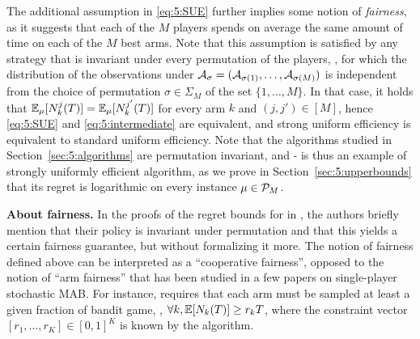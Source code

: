 The additional assumption in \eqref{eq:5:SUE} further implies some notion of \emph{fairness}, as it suggests that each of the $M$ players spends on average the same amount of time on each of the $M$ best arms. Note that this assumption is satisfied by any strategy that is invariant under every permutation of the players, \ie, for which the distribution of the observations under $\mathcal{A}_{\sigma} = (\mathcal{A}_{\sigma(1)},\dots,\mathcal{A}_{\sigma(M)})$ is independent from the choice of permutation $\sigma \in \Sigma_M$ of the set $\{1,\dots,M\}$.
In that case, it holds that  $\mathbb{E}_{\mu}[N_k^j(T)]=\mathbb{E}_{\mu}[N_k^{j'}(T)]$ for every arm $k$ and $(j,j') \in [M]$, hence \eqref{eq:5:SUE} and \eqref{eq:5:intermediate} are equivalent, and strong uniform efficiency is equivalent to standard uniform efficiency.
Note that the algorithms studied in Section~\ref{sec:5:algorithms} are permutation invariant, and \MCTopM-\klUCB{} is thus an example of strongly uniformly efficient algorithm, as we prove in Section~\ref{sec:5:upperbounds} that its regret is logarithmic on every instance $\mu \in \mathcal{P}_M$.

\textbf{About fairness.}
%
In the proofs of the regret bounds for \rhoRand{} in \cite{Anandkumar11}, the authors briefly mention that their policy is invariant under permutation and that this yields a certain fairness guarantee, but without formalizing it more.
The notion of fairness defined above can be interpreted as a ``cooperative fairness'', opposed to the notion of ``arm fairness'' that has been studied in a few papers on single-player stochastic MAB.
For instance, \cite{Patil2019stochastic} requires that each arm must be sampled at least a given fraction of bandit game, \ie, $\forall k, \mathbb{E}[N_k(T)] \geq r_k T$, where the constraint vector $[r_1,\dots,r_K] \in [0,1]^K$ is known by the algorithm.



